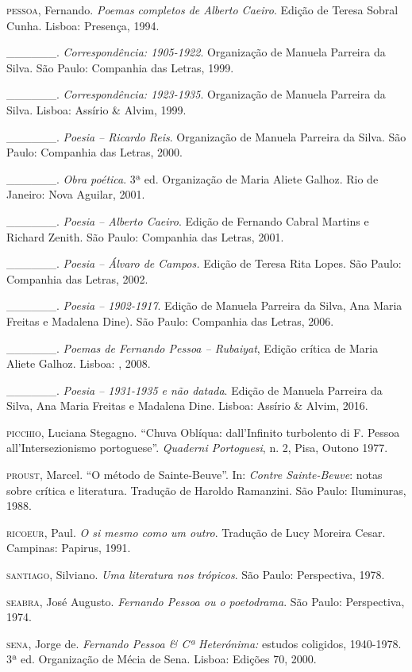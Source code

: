 \begin{hangparas}{.35in}{1}
\textsc{pessoa}, Fernando. \emph{Poemas completos de Alberto Caeiro}.
Edição de Teresa Sobral Cunha. Lisboa: Presença, 1994.

\_\_\_\_\_\_. \emph{Correspondência: 1905-1922}. Organização de Manuela
Parreira da Silva. São Paulo: Companhia das Letras, 1999.

\_\_\_\_\_\_. \emph{Correspondência: 1923-1935}. Organização de Manuela
Parreira da Silva. Lisboa: Assírio \& Alvim, 1999.

\_\_\_\_\_\_. \emph{Poesia -- Ricardo Reis}. Organização de Manuela
Parreira da Silva. São Paulo: Companhia das Letras, 2000.

\_\_\_\_\_\_. \emph{Obra poética}. 3ª ed. Organização de Maria Aliete
Galhoz. Rio de Janeiro: Nova Aguilar, 2001.

\_\_\_\_\_\_. \emph{Poesia -- Alberto Caeiro}. Edição de Fernando Cabral
Martins e Richard Zenith. São Paulo: Companhia das Letras, 2001.

\_\_\_\_\_\_. \emph{Poesia -- Álvaro de Campos.} Edição de Teresa Rita
Lopes. São Paulo: Companhia das Letras, 2002.

\_\_\_\_\_\_. \emph{Poesia -- 1902-1917}. Edição de Manuela Parreira da
Silva, Ana Maria Freitas e Madalena Dine). São Paulo: Companhia das
Letras, 2006.

\_\_\_\_\_\_. \emph{Poemas de Fernando Pessoa -- Rubaiyat}, Edição
crítica de Maria Aliete Galhoz. Lisboa: , 2008.

\_\_\_\_\_\_. \emph{Poesia -- 1931-1935 e não datada}. Edição de Manuela
Parreira da Silva, Ana Maria Freitas e Madalena Dine. Lisboa: Assírio \&
Alvim, 2016.

\textsc{picchio}, Luciana Stegagno. ``Chuva Oblíqua: dall'Infinito
turbolento di F. Pessoa all'Intersezionismo portoguese''. \emph{Quaderni
Portoguesi}, n. 2, Pisa, Outono 1977.

\textsc{proust}, Marcel. ``O método de Sainte-Beuve''. In: \emph{Contre
Sainte-Beuve}: notas sobre crítica e literatura. Tradução de Haroldo
Ramanzini. São Paulo: Iluminuras, 1988.

\textsc{ricoeur}, Paul. \emph{O si mesmo como um outro}. Tradução de
Lucy Moreira Cesar. Campinas: Papirus, 1991.

\textsc{santiago}, Silviano. \emph{Uma literatura nos trópicos}. São
Paulo: Perspectiva, 1978.

\textsc{seabra}, José Augusto. \emph{Fernando Pessoa ou o poetodrama}.
São Paulo: Perspectiva, 1974.

\textsc{sena}, Jorge de. \emph{Fernando Pessoa \& Cª Heterónima:}
estudos coligidos, 1940-1978. 3ª ed. Organização de Mécia de Sena.
Lisboa: Edições 70, 2000.


\end{hangparas}
